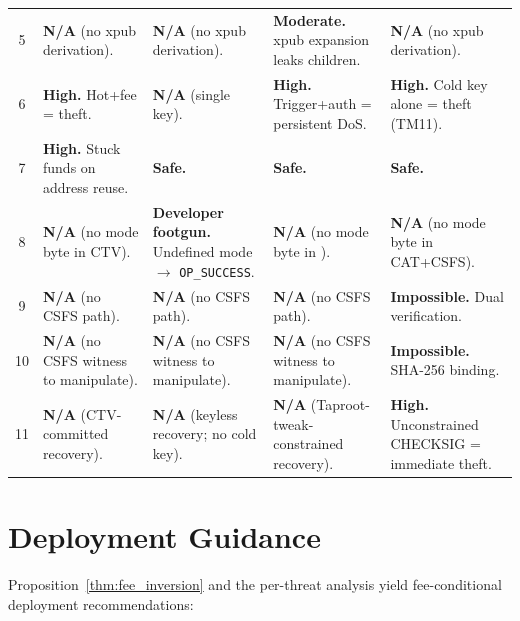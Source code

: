 \begin{table}[p]
\begin{tabular}{@{}cp{2.6cm}p{2.6cm}p{2.6cm}p{2.6cm}@{}}
5 & \textbf{N/A} (no xpub derivation).
  & \textbf{N/A} (no xpub derivation).
  & \textbf{Moderate.} xpub expansion leaks children.
  & \textbf{N/A} (no xpub derivation). \\[6pt]

6 & \textbf{High.} Hot+fee = theft.
  & \textbf{N/A} (single key).
  & \textbf{High.} Trigger+auth = persistent DoS.
  & \textbf{High.} Cold key alone = theft (TM11). \\[6pt]

7 & \textbf{High.} Stuck funds on address reuse.
  & \textbf{Safe.}
  & \textbf{Safe.}
  & \textbf{Safe.} \\[6pt]

8 & \textbf{N/A} (no mode byte in CTV).
  & \textbf{Developer footgun.} Undefined mode $\rightarrow$ \texttt{OP\_SUCCESS}.
  & \textbf{N/A} (no mode byte in \opvault{}).
  & \textbf{N/A} (no mode byte in CAT+CSFS). \\[6pt]

9 & \textbf{N/A} (no CSFS path).
  & \textbf{N/A} (no CSFS path).
  & \textbf{N/A} (no CSFS path).
  & \textbf{Impossible.} Dual verification. \\[6pt]

10 & \textbf{N/A} (no CSFS witness to manipulate).
   & \textbf{N/A} (no CSFS witness to manipulate).
   & \textbf{N/A} (no CSFS witness to manipulate).
   & \textbf{Impossible.} SHA-256 binding. \\[6pt]

11 & \textbf{N/A} (CTV-committed recovery).
   & \textbf{N/A} (keyless recovery; no cold key).
   & \textbf{N/A} (Taproot-tweak-constrained recovery).
   & \textbf{High.} Unconstrained CHECKSIG = immediate theft. \\
\bottomrule
\end{tabular}
\end{table}

\section{Deployment Guidance} \label{se:deployment}

Proposition~\ref{thm:fee_inversion} and the per-threat analysis yield fee-conditional
deployment recommendations:

